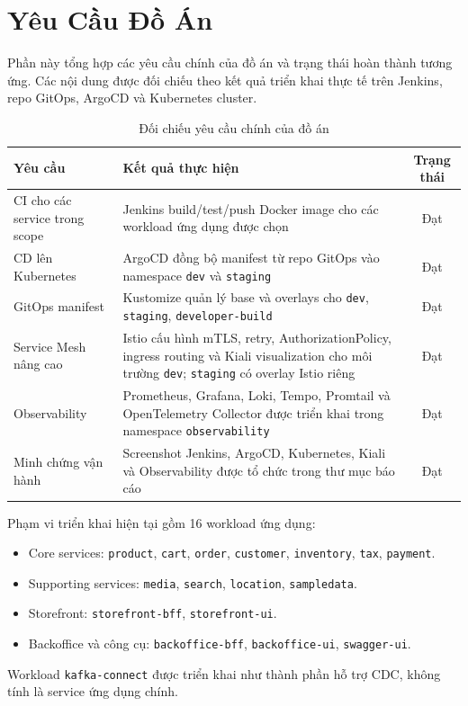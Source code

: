 \section{Yêu Cầu Đồ Án}

Phần này tổng hợp các yêu cầu chính của đồ án và trạng thái hoàn thành tương ứng. Các nội dung được đối chiếu theo kết quả triển khai thực tế trên Jenkins, repo GitOps, ArgoCD và Kubernetes cluster.

\begin{table}[H]
\centering
\caption{Đối chiếu yêu cầu chính của đồ án}
\small
\begin{tabular}{|p{}|p{}|c|}
\hline
\textbf{Yêu cầu} & \textbf{Kết quả thực hiện} & \textbf{Trạng thái} \\
\hline
CI cho các service trong scope & Jenkins build/test/push Docker image cho các workload ứng dụng được chọn & Đạt \\
\hline
CD lên Kubernetes & ArgoCD đồng bộ manifest từ repo GitOps vào namespace \texttt{dev} và \texttt{staging} & Đạt \\
\hline
GitOps manifest & Kustomize quản lý base và overlays cho \texttt{dev}, \texttt{staging}, \texttt{developer-build} & Đạt \\
\hline
Service Mesh nâng cao & Istio cấu hình mTLS, retry, AuthorizationPolicy, ingress routing và Kiali visualization cho môi trường \texttt{dev}; \texttt{staging} có overlay Istio riêng & Đạt \\
\hline
Observability & Prometheus, Grafana, Loki, Tempo, Promtail và OpenTelemetry Collector được triển khai trong namespace \texttt{observability} & Đạt \\
\hline
Minh chứng vận hành & Screenshot Jenkins, ArgoCD, Kubernetes, Kiali và Observability được tổ chức trong thư mục báo cáo & Đạt \\
\hline
\end{tabular}
\end{table}

Phạm vi triển khai hiện tại gồm 16 workload ứng dụng:

\begin{itemize}
  \item Core services: \texttt{product}, \texttt{cart}, \texttt{order}, \texttt{customer}, \texttt{inventory}, \texttt{tax}, \texttt{payment}.
  \item Supporting services: \texttt{media}, \texttt{search}, \texttt{location}, \texttt{sampledata}.
  \item Storefront: \texttt{storefront-bff}, \texttt{storefront-ui}.
  \item Backoffice và công cụ: \texttt{backoffice-bff}, \texttt{backoffice-ui}, \texttt{swagger-ui}.
\end{itemize}

Workload \texttt{kafka-connect} được triển khai như thành phần hỗ trợ CDC, không tính là service ứng dụng chính.
